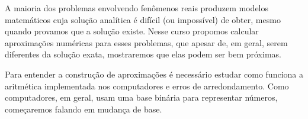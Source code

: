 A maioria dos problemas envolvendo fenômenos reais produzem modelos matemáticos cuja solução analítica é difícil (ou impossível) de obter, mesmo quando provamos que a solução existe. Nesse curso propomos calcular aproximações numéricas para esses problemas, que apesar de, em geral, serem diferentes da solução exata, mostraremos que elas podem ser bem próximas.

Para entender a construção de aproximações é necessário estudar como funciona a aritmética implementada nos computadores e erros de arredondamento. Como computadores, em geral, usam uma base binária para representar números, começaremos falando em mudança de base.


%
